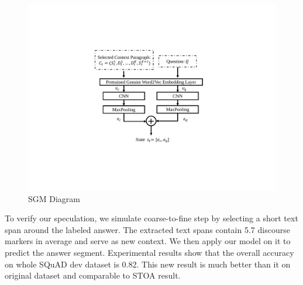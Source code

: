 \begin{figure}\centering
\begin{minipage}{.45\textwidth}
 \includegraphics[width=0.9\linewidth]{fig/fig1_2.pdf}
 \caption{SGM Diagram}
 \label{fig:sgmDiagram}
\end{minipage}
\vspace{-2ex}
\end{figure}

To verify our speculation, we simulate coarse-to-fine step by selecting a short text span around the labeled answer. The extracted text spans contain 5.7 discourse markers in average and serve as new context. We then apply our model on it to predict the answer segment. Experimental results show that the overall accuracy on whole SQuAD dev dataset is 0.82. This new result is much better than it on original dataset and comparable to STOA result. 